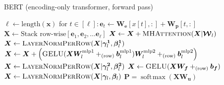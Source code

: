 \documentclass[12pt,aspectratio=169,handout]{beamer}
\DeclareMathOperator*{\softmax}{soft\!\max}
\begin{document}
\begin{frame}{BERT (encoding-only transformer, forward pass)}
	
	\vspace{-2em}
	\begin{minipage}[t][10cm][t]{15cm}
		\begin{algorithmic}[1]
			\State $\ell \gets \text{length}(\bm{x})$
			\State for $t \in [\ell]: \bm{e}_t \gets \bm{W_e}[x[t],:] + \bm{W_p}[t,:]$
			\State $\bm{X} \gets \text{Stack row-wise}[\bm{e}_1, \bm{e}_2, \ldots \bm{e}_{\ell}]$
			\State $\bm{X} \gets \bm{X} + \textsc{MHAttention}(\bm{X} | \bm{\mathcal{W}}_l)$
			\State $\bm{X} \gets \textsc{LayerNormPerRow}(\bm{X} | \bm{\gamma^1}_l, \bm{\beta^1}_l)$
			\State $\bm{X} \gets \bm{X} + \left(
			\textsc{GELU}(\bm{X} \bm{W}^\text{mlp1}_l +_{\text{(row)}} \bm{b}^\text{mlp1}_l )
			\bm{W}^{\text{mlp2}}_l +_{\text{(row)}} \bm{b}^{\text{mlp2}}_l \right)$
			\State $\bm{X} \gets \textsc{LayerNormPerRow}(\bm{X} | \bm{\gamma^2}_l, \bm{\beta^2}_l)$
			\EndFor
			\State $\bm{X} \gets \textsc{GELU}(\bm{X} \bm{W_f}  +_{\text{(row)}} \bm{b_f} )$
			\State $\bm{X} \gets \textsc{LayerNormPerRow}(\bm{X} | \bm{\gamma}_l, \bm{\beta}_l)$
			\State \Return $\bm{P} = \softmax(\bm{X} \bm{W_u}) $
			\EndFunction
		\end{algorithmic}
		
	\end{minipage}
\end{frame}
\end{document}
